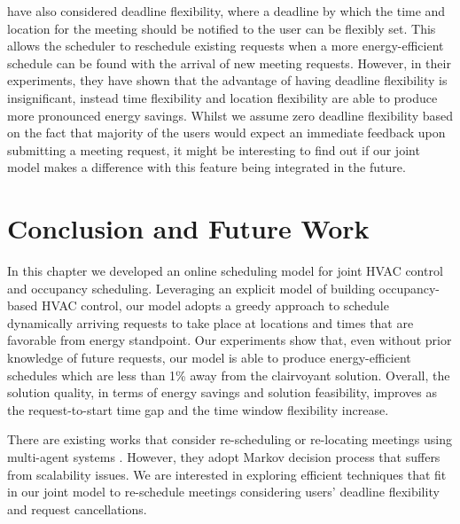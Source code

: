 \cite{kwak2013tesla} have also considered deadline flexibility, where a deadline by which the time and location for the meeting should be notified to the user can be flexibly set. This allows the scheduler to reschedule existing requests when a more energy-efficient schedule can be found with the arrival of new meeting requests. However, in their experiments, they have shown that the advantage of having deadline flexibility is insignificant, instead time flexibility and location flexibility are able to produce more pronounced energy savings.
Whilst we assume zero deadline flexibility based on the fact that majority of the users would expect an immediate feedback upon submitting a meeting request, it might be interesting to find out if our joint model makes a difference with this feature being integrated in the future. 


\section{Conclusion and Future Work} \label{sec:online:conclusion}





In this chapter we developed an online scheduling model for joint HVAC control and occupancy scheduling. Leveraging an explicit model of building occupancy-based HVAC control, our model adopts a greedy approach to schedule dynamically arriving requests to take place at locations and times that are favorable from energy standpoint. Our experiments show that, even without prior knowledge of future requests, our model is able to produce energy-efficient schedules which are less than 1\% away from the clairvoyant solution. Overall, the solution quality, in terms of energy savings and solution feasibility, improves as the request-to-start time gap and the time window flexibility increase. 

There are existing works that consider re-scheduling or re-locating meetings using multi-agent systems \citep{kwak2014building,klein2012coordinating}. However, they adopt Markov decision process that suffers from scalability issues. We are interested in exploring efficient techniques that fit in our joint model to re-schedule meetings considering users' deadline flexibility and request cancellations. 

